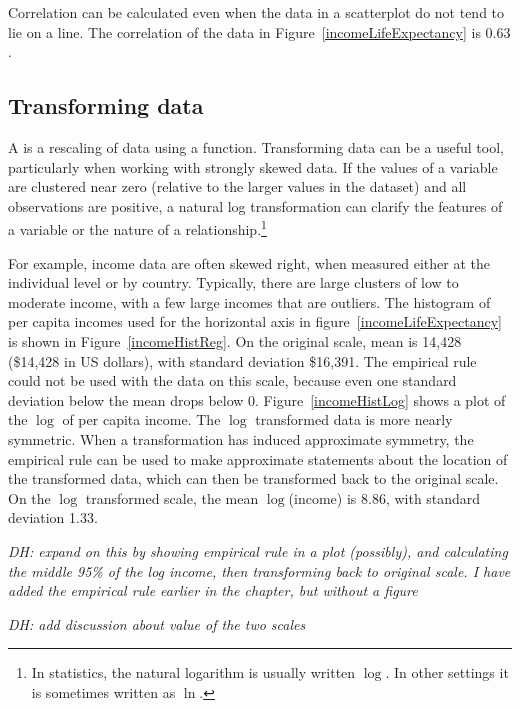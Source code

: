 Correlation can be calculated even when the data in a scatterplot do not tend to lie on a line. The correlation of the data in Figure~\ref{incomeLifeExpectancy} is $0.63$.


\subsection{Transforming data}
\label{transformingDataSubsection}



A  is a rescaling of data using a function. Transforming data can be a useful tool, particularly when working with strongly skewed data. If the values of a variable are clustered near zero (relative to the larger values in the dataset) and all observations are positive, a natural log transformation can clarify the features of a variable or the nature of a relationship.\footnote{In statistics, the natural logarithm is usually written $\log$. In other settings it is sometimes written as  $\ln$.}

For example, income data are often skewed right, when measured either at the individual level or by country. Typically, there are large clusters of low to moderate income, with a few large incomes that are outliers. The histogram of per capita incomes used for the horizontal axis in figure~\ref{incomeLifeExpectancy} is shown in Figure~\ref{incomeHistReg}. On the original scale, mean  is 14,428 (\$14,428 in US dollars), with standard deviation \$16,391.  The empirical rule could not be used with the data on this scale, because even one standard deviation below the mean drops below 0. Figure~\ref{incomeHistLog} shows a plot of the $\log$ of per capita income. The $\log$ transformed data is more nearly symmetric. When a transformation has induced approximate symmetry, the empirical rule can be used to make approximate statements about the location of the transformed data, which can then be transformed back to the original scale.  On the $\log$ transformed scale, the mean $\log$(income) is 8.86, with standard deviation 1.33.

\textit{DH: expand on this by showing empirical rule in a plot (possibly), and calculating the middle 95\% of the log income, then transforming back to original scale.  I have added the empirical rule earlier in the chapter, but without a figure}

\textit{DH: add discussion about value of the two scales}

